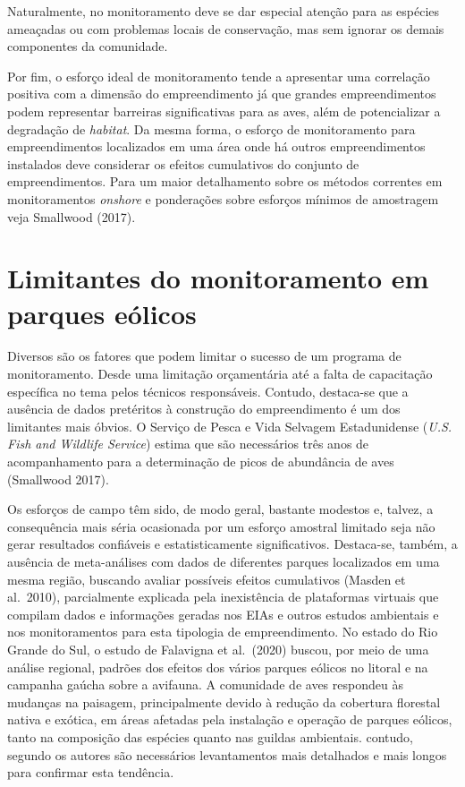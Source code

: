 \documentclass[
  oneside]{scrbook}
\begin{document}
Naturalmente, no monitoramento deve se dar especial atenção para as espécies ameaçadas ou com problemas locais de conservação, mas sem ignorar os demais componentes da comunidade.

Por fim, o esforço ideal de monitoramento tende a apresentar uma correlação positiva com a dimensão do empreendimento já que grandes empreendimentos podem representar barreiras significativas para as aves, além de potencializar a degradação de \emph{habitat}. Da mesma forma, o esforço de monitoramento para empreendimentos localizados em uma área onde há outros empreendimentos instalados deve considerar os efeitos cumulativos do conjunto de empreendimentos. Para um maior detalhamento sobre os métodos correntes em monitoramentos \emph{onshore} e ponderações sobre esforços mínimos de amostragem veja Smallwood (2017).

\hypertarget{limitantes-do-monitoramento-em-parques-euxf3licos}{%
\section{Limitantes do monitoramento em parques eólicos}\label{limitantes-do-monitoramento-em-parques-euxf3licos}}

Diversos são os fatores que podem limitar o sucesso de um programa de monitoramento. Desde uma limitação orçamentária até a falta de capacitação específica no tema pelos técnicos responsáveis. Contudo, destaca-se que a ausência de dados pretéritos à construção do empreendimento é um dos limitantes mais óbvios. O Serviço de Pesca e Vida Selvagem Estadunidense (\emph{U.S. Fish and Wildlife Service}) estima que são necessários três anos de acompanhamento para a determinação de picos de abundância de aves (Smallwood 2017).

Os esforços de campo têm sido, de modo geral, bastante modestos e, talvez, a consequência mais séria ocasionada por um esforço amostral limitado seja não gerar resultados confiáveis e estatisticamente significativos. Destaca-se, também, a ausência de meta-análises com dados de diferentes parques localizados em uma mesma região, buscando avaliar possíveis efeitos cumulativos (Masden et al.~2010), parcialmente explicada pela inexistência de plataformas virtuais que compilam dados e informações geradas nos EIAs e outros estudos ambientais e nos monitoramentos para esta tipologia de empreendimento. No estado do Rio Grande do Sul, o estudo de Falavigna et al.~(2020) buscou, por meio de uma análise regional, padrões dos efeitos dos vários parques eólicos no litoral e na campanha gaúcha sobre a avifauna. A comunidade de aves respondeu às mudanças na paisagem, principalmente devido à redução da cobertura florestal nativa e exótica, em áreas afetadas pela instalação e operação de parques eólicos, tanto na composição das espécies quanto nas guildas ambientais. contudo, segundo os autores são necessários levantamentos mais detalhados e mais longos para confirmar esta tendência.
\end{document}

